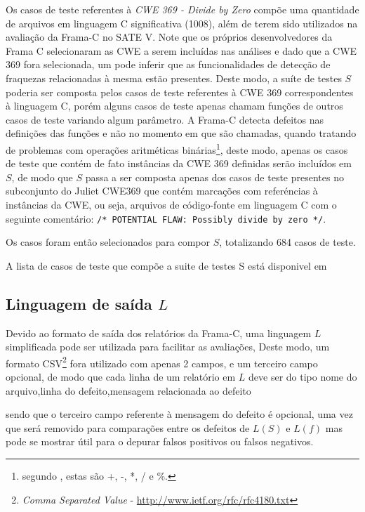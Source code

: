 Os casos de teste referentes à \textit{CWE 369 - Divide by Zero} compõe uma quantidade de arquivos em linguagem C significativa (1008), além de terem sido utilizados na avaliação da Frama-C no SATE V. Note que os próprios desenvolvedores da Frama C selecionaram as CWE a serem incluídas nas análises e dado que a CWE 369 fora selecionada, um pode inferir que as funcionalidades de detecção de fraquezas relacionadas à mesma estão presentes. Deste modo, a suíte de testes $S$ poderia ser composta pelos casos de teste referentes à CWE 369 correspondentes à linguagem C, porém alguns casos de teste apenas chamam funções de outros casos de teste variando algum parâmetro.  A Frama-C detecta defeitos nas definições das funções e não no momento em que são chamadas, quando tratando de problemas com operações aritméticas binárias\footnote{segundo \cite{kernighan}, estas são +, -, *, / e \%.}, deste modo, apenas os casos de teste que contém de fato instâncias da CWE 369 definidas serão incluídos em $S$, de modo que  $S$ passa a ser composta apenas dos casos de teste presentes no subconjunto do Juliet CWE369 que contém marcações com referéncias à instâncias da CWE, ou seja, arquivos de código-fonte em linguagem C com o seguinte comentário:
  \lstinline{/* POTENTIAL FLAW: Possibly divide by zero */}.

  Os casos foram então selecionados para compor $S$, totalizando 684 casos de teste.

  A lista de casos de teste que compõe a suite de testes S está disponivel em 

  \subsection{Linguagem de saída $L$}

  Devido ao formato de saída dos relatórios da Frama-C, uma linguagem $L$ simplificada pode ser utilizada para facilitar as avaliações, Deste modo, um formato CSV\footnote{\textit{Comma Separated Value} - \url{http://www.ietf.org/rfc/rfc4180.txt}} fora utilizado com apenas 2 campos, e um terceiro campo opcional, de modo que cada linha de um relatório em $L$ deve ser do tipo
  nome do arquivo,linha do defeito,mensagem relacionada ao defeito

  sendo que o terceiro campo referente à mensagem do defeito é opcional, uma vez que será removido para comparações entre os defeitos de $L(S)$ e $L(f)$ mas pode se mostrar útil para o depurar falsos positivos ou falsos negativos.

